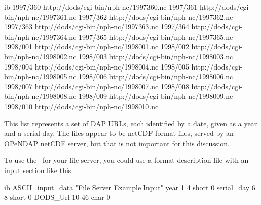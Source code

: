 \begin{vcode}{ib}
1997/360 http://dods/cgi-bin/nph-nc/1997360.nc
1997/361 http://dods/cgi-bin/nph-nc/1997361.nc
1997/362 http://dods/cgi-bin/nph-nc/1997362.nc
1997/363 http://dods/cgi-bin/nph-nc/1997363.nc
1997/364 http://dods/cgi-bin/nph-nc/1997364.nc
1997/365 http://dods/cgi-bin/nph-nc/1997365.nc
1998/001 http://dods/cgi-bin/nph-nc/1998001.nc
1998/002 http://dods/cgi-bin/nph-nc/1998002.nc
1998/003 http://dods/cgi-bin/nph-nc/1998003.nc
1998/004 http://dods/cgi-bin/nph-nc/1998004.nc
1998/005 http://dods/cgi-bin/nph-nc/1998005.nc
1998/006 http://dods/cgi-bin/nph-nc/1998006.nc
1998/007 http://dods/cgi-bin/nph-nc/1998007.nc
1998/008 http://dods/cgi-bin/nph-nc/1998008.nc
1998/009 http://dods/cgi-bin/nph-nc/1998009.nc
1998/010 http://dods/cgi-bin/nph-nc/1998010.nc
\end{vcode}

This list represents a set of DAP URLs, each identified by a date,
given as a year and a serial day.  The files appear to be netCDF
format files, served by an OPeNDAP netCDF server, but that is not
important for this discussion.

To use the \ffs\ for your file server, you could use a format
description file with an input section like this:

\begin{vcode}{ib}
ASCII_input_data "File Server Example Input"
year 1 4 short 0
serial_day 6 8 short 0
DODS_Url 10 46 char 0
\end{vcode}

